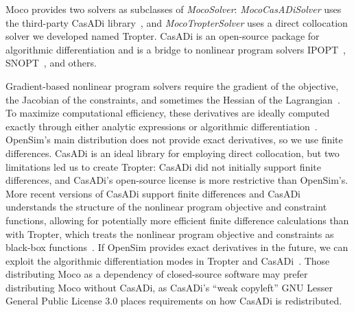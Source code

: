 \documentclass[10pt,letterpaper]{article}
\begin{document}
Moco provides two solvers as subclasses of \textit{MocoSolver}: \textit{MocoCasADiSolver} uses the third-party CasADi library~\cite{Andersson:2019}, and \textit{MocoTropterSolver} uses a direct collocation solver we developed named Tropter. CasADi is an open-source package for algorithmic differentiation and is a bridge to nonlinear program solvers IPOPT~\cite{Wachter:2006}, SNOPT~\cite{Gill:2005}, and others.

Gradient-based nonlinear program solvers require the gradient of the objective, the Jacobian of the constraints, and sometimes the Hessian of the Lagrangian~\cite{Betts:2010}. To maximize computational efficiency, these derivatives are ideally computed exactly through either analytic expressions or algorithmic differentiation~\cite{Andersson:2019,Walther:2003}. OpenSim's main distribution does not provide exact derivatives, so we use finite differences. CasADi is an ideal library for employing direct collocation, but two limitations led us to create Tropter: CasADi did not initially support finite differences, and CasADi's open-source license is more restrictive than OpenSim's. More recent versions of CasADi support finite differences and CasADi understands the structure of the nonlinear program objective and constraint functions, allowing for potentially more efficient finite difference calculations than with Tropter, which treats the nonlinear program objective and constraints as black-box functions~\cite{Patterson:2012}. If OpenSim provides exact derivatives in the future, we can exploit the algorithmic differentiation modes in Tropter and CasADi~\cite{Falisse:2019a}. Those distributing Moco as a dependency of closed-source software may prefer distributing Moco without CasADi, as CasADi's ``weak copyleft'' GNU Lesser General Public License 3.0 places requirements on how CasADi is redistributed.

\nolinenumbers

%
%
%


\end{document}
